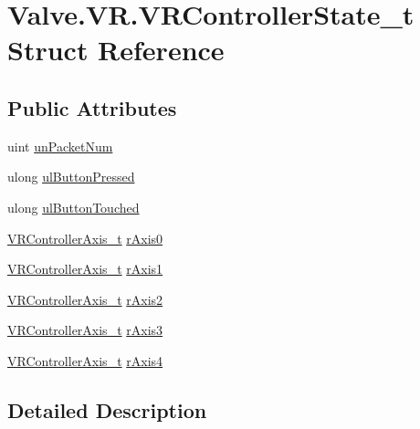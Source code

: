 \hypertarget{struct_valve_1_1_v_r_1_1_v_r_controller_state__t}{}\section{Valve.\+V\+R.\+V\+R\+Controller\+State\+\_\+t Struct Reference}
\label{struct_valve_1_1_v_r_1_1_v_r_controller_state__t}
\subsection*{Public Attributes}
\begin{DoxyCompactItemize}
\item 
uint \mbox{\hyperlink{struct_valve_1_1_v_r_1_1_v_r_controller_state__t_a2b0664725a9edc5d20cd2a103b294a34}{un\+Packet\+Num}}
\item 
ulong \mbox{\hyperlink{struct_valve_1_1_v_r_1_1_v_r_controller_state__t_afd749240b40aa74f03ba354ab19e43ed}{ul\+Button\+Pressed}}
\item 
ulong \mbox{\hyperlink{struct_valve_1_1_v_r_1_1_v_r_controller_state__t_a8847792f0982e92064304172718ae211}{ul\+Button\+Touched}}
\item 
\mbox{\hyperlink{struct_valve_1_1_v_r_1_1_v_r_controller_axis__t}{V\+R\+Controller\+Axis\+\_\+t}} \mbox{\hyperlink{struct_valve_1_1_v_r_1_1_v_r_controller_state__t_a9734722addc3a96cc9e1039a05dd01be}{r\+Axis0}}
\item 
\mbox{\hyperlink{struct_valve_1_1_v_r_1_1_v_r_controller_axis__t}{V\+R\+Controller\+Axis\+\_\+t}} \mbox{\hyperlink{struct_valve_1_1_v_r_1_1_v_r_controller_state__t_aab2b63cf0d653dc00ac933bbc157c875}{r\+Axis1}}
\item 
\mbox{\hyperlink{struct_valve_1_1_v_r_1_1_v_r_controller_axis__t}{V\+R\+Controller\+Axis\+\_\+t}} \mbox{\hyperlink{struct_valve_1_1_v_r_1_1_v_r_controller_state__t_a3eac9961bd65cb3519fb4a0997e0ecc4}{r\+Axis2}}
\item 
\mbox{\hyperlink{struct_valve_1_1_v_r_1_1_v_r_controller_axis__t}{V\+R\+Controller\+Axis\+\_\+t}} \mbox{\hyperlink{struct_valve_1_1_v_r_1_1_v_r_controller_state__t_a8a4e30a6d13662749a522f220b4dec53}{r\+Axis3}}
\item 
\mbox{\hyperlink{struct_valve_1_1_v_r_1_1_v_r_controller_axis__t}{V\+R\+Controller\+Axis\+\_\+t}} \mbox{\hyperlink{struct_valve_1_1_v_r_1_1_v_r_controller_state__t_ac8bdb4dec694718b67b44d8989b0307c}{r\+Axis4}}
\end{DoxyCompactItemize}


\subsection{Detailed Description}


